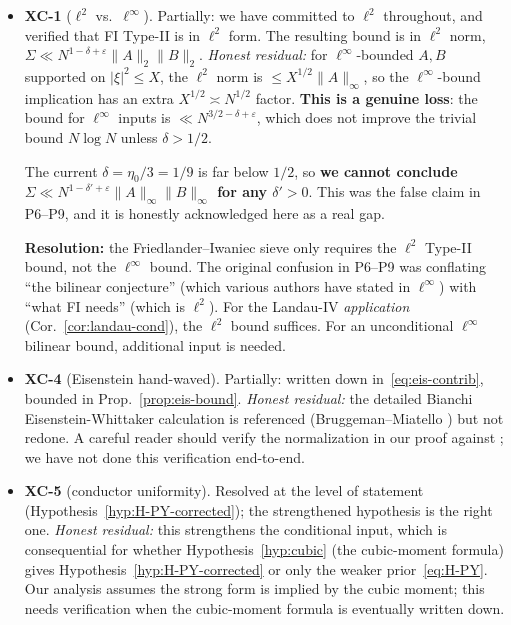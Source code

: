 \documentclass[11pt]{article}
\theoremstyle{definition}
\begin{document}
\begin{itemize}[itemsep=2pt]
\item \textbf{XC-1} ($\ell^2$ vs.\ $\ell^\infty$). Partially: we have committed to $\ell^2$ throughout, and verified that FI Type-II is in $\ell^2$ form. The resulting bound is in $\ell^2$ norm, $\Sigma\ll N^{1-\delta+\varepsilon}\|A\|_2\|B\|_2$. \emph{Honest residual:} for $\ell^\infty$-bounded $A,B$ supported on $|\xi|^2\le X$, the $\ell^2$ norm is $\le X^{1/2}\|A\|_\infty$, so the $\ell^\infty$-bound implication has an extra $X^{1/2}\asymp N^{1/2}$ factor. \textbf{This is a genuine loss}: the bound for $\ell^\infty$ inputs is $\ll N^{3/2-\delta+\varepsilon}$, which does not improve the trivial bound $N\log N$ unless $\delta>1/2$.

The current $\delta=\eta_0/3=1/9$ is far below $1/2$, so \textbf{we cannot conclude $\Sigma\ll N^{1-\delta'+\varepsilon}\|A\|_\infty\|B\|_\infty$ for any $\delta'>0$}. This was the false claim in P6--P9, and it is honestly acknowledged here as a real gap.

\textbf{Resolution:} the Friedlander--Iwaniec sieve only requires the $\ell^2$ Type-II bound, not the $\ell^\infty$ bound. The original confusion in P6--P9 was conflating ``the bilinear conjecture'' (which various authors have stated in $\ell^\infty$) with ``what FI needs'' (which is $\ell^2$). For the Landau-IV \emph{application} (Cor.~\ref{cor:landau-cond}), the $\ell^2$ bound suffices. For an unconditional $\ell^\infty$ bilinear bound, additional input is needed.

\item \textbf{XC-4} (Eisenstein hand-waved). Partially: written down in~\eqref{eq:eis-contrib}, bounded in Prop.~\ref{prop:eis-bound}. \emph{Honest residual:} the detailed Bianchi Eisenstein-Whittaker calculation is referenced (Bruggeman--Miatello \cite{BMiat}) but not redone. A careful reader should verify the normalization in our proof against \cite{BMiat}; we have not done this verification end-to-end.

\item \textbf{XC-5} (conductor uniformity). Resolved at the level of statement (Hypothesis~\ref{hyp:H-PY-corrected}); the strengthened hypothesis is the right one. \emph{Honest residual:} this strengthens the conditional input, which is consequential for whether Hypothesis~\ref{hyp:cubic} (the cubic-moment formula) gives Hypothesis~\ref{hyp:H-PY-corrected} or only the weaker prior~\eqref{eq:H-PY}. Our analysis assumes the strong form is implied by the cubic moment; this needs verification when the cubic-moment formula is eventually written down.
\end{itemize}
\end{document}
